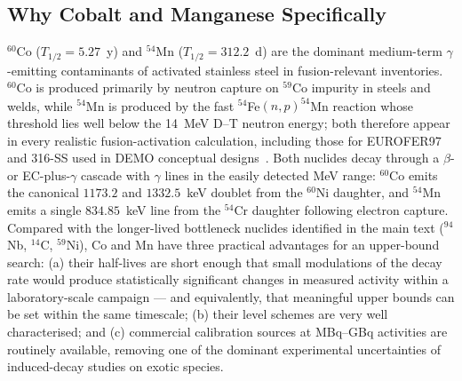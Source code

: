 \documentclass[conference]{IEEEtran}
\begin{document}
\subsection{Why Cobalt and Manganese Specifically}
$^{60}$Co ($T_{1/2}=5.27$~y) and $^{54}$Mn ($T_{1/2}=312.2$~d) are the dominant medium-term $\gamma$-emitting contaminants of activated stainless steel in fusion-relevant inventories. $^{60}$Co is produced primarily by neutron capture on $^{59}$Co impurity in steels and welds, while $^{54}$Mn is produced by the fast $^{54}$Fe$(n,p)^{54}$Mn reaction whose threshold lies well below the 14~MeV D--T neutron energy; both therefore appear in every realistic fusion-activation calculation, including those for EUROFER97 and 316-SS used in DEMO conceptual designs~\cite{gonzalez2022overview}. Both nuclides decay through a $\beta$- or EC-plus-$\gamma$ cascade with $\gamma$ lines in the easily detected MeV range: $^{60}$Co emits the canonical $1173.2$ and $1332.5$~keV doublet from the $^{60}$Ni daughter, and $^{54}$Mn emits a single $834.85$~keV line from the $^{54}$Cr daughter following electron capture. Compared with the longer-lived bottleneck nuclides identified in the main text ($^{94}$Nb, $^{14}$C, $^{59}$Ni), Co and Mn have three practical advantages for an upper-bound search: (a) their half-lives are short enough that small modulations of the decay rate would produce statistically significant changes in measured activity within a laboratory-scale campaign --- and equivalently, that meaningful upper bounds can be set within the same timescale; (b) their level schemes are very well characterised; and (c) commercial calibration sources at MBq--GBq activities are routinely available, removing one of the dominant experimental uncertainties of induced-decay studies on exotic species.
\end{document}
